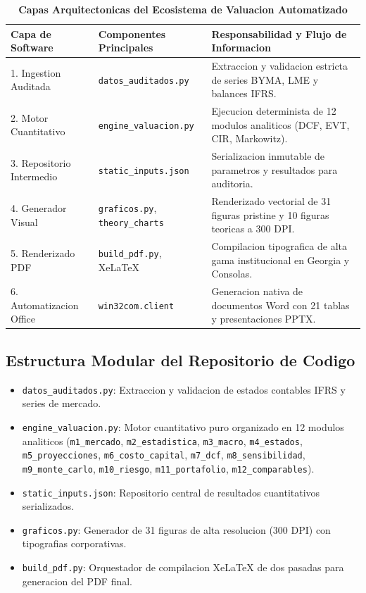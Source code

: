 \documentclass[10pt,a4paper]{article}
\theoremstyle{definition}
\begin{document}
\begin{table}[H]
\centering
\caption{\textbf{Capas Arquitectonicas del Ecosistema de Valuacion Automatizado}}
\small
\begin{tabular}{lll}
\toprule
\textbf{Capa de Software} & \textbf{Componentes Principales} & \textbf{Responsabilidad y Flujo de Informacion} \\
\midrule
1. Ingestion Auditada & \texttt{datos\_auditados.py} & Extraccion y validacion estricta de series BYMA, LME y balances IFRS. \\
2. Motor Cuantitativo & \texttt{engine\_valuacion.py} & Ejecucion determinista de 12 modulos analiticos (DCF, EVT, CIR, Markowitz). \\
3. Repositorio Intermedio & \texttt{static\_inputs.json} & Serializacion inmutable de parametros y resultados para auditoria. \\
4. Generador Visual & \texttt{graficos.py}, \texttt{theory\_charts} & Renderizado vectorial de 31 figuras pristine y 10 figuras teoricas a 300 DPI. \\
5. Renderizado PDF & \texttt{build\_pdf.py}, XeLaTeX & Compilacion tipografica de alta gama institucional en Georgia y Consolas. \\
6. Automatizacion Office & \texttt{win32com.client} & Generacion nativa de documentos Word con 21 tablas y presentaciones PPTX. \\
\bottomrule
\end{tabular}
\end{table}

\subsection{Estructura Modular del Repositorio de Codigo}
\begin{itemize}
    \item \texttt{datos\_auditados.py}: Extraccion y validacion de estados contables IFRS y series de mercado.
    \item \texttt{engine\_valuacion.py}: Motor cuantitativo puro organizado en 12 modulos analiticos (\texttt{m1\_mercado}, \texttt{m2\_estadistica}, \texttt{m3\_macro}, \texttt{m4\_estados}, \texttt{m5\_proyecciones}, \texttt{m6\_costo\_capital}, \texttt{m7\_dcf}, \texttt{m8\_sensibilidad}, \texttt{m9\_monte\_carlo}, \texttt{m10\_riesgo}, \texttt{m11\_portafolio}, \texttt{m12\_comparables}).
    \item \texttt{static\_inputs.json}: Repositorio central de resultados cuantitativos serializados.
    \item \texttt{graficos.py}: Generador de 31 figuras de alta resolucion (300 DPI) con tipografias corporativas.
    \item \texttt{build\_pdf.py}: Orquestador de compilacion XeLaTeX de dos pasadas para generacion del PDF final.
\end{itemize}
\end{document}
